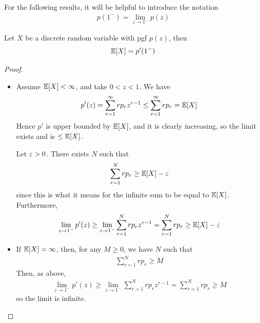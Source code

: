 \documentclass{../../template/note}
\begin{document}
    For the following results, it will be helpful to introduce the notation
    \begin{align*}
        p(1^-) = \lim_{z \to 1^-} p(z)
    \end{align*}

    \begin{proposition}
        Let \(X\) be a discrete random variable with pgf \(p(z)\), then
        \begin{align*}
            \mathbb E[X] = p'(1^-)
        \end{align*}
    \end{proposition}
    
    \begin{proof}
        \begin{itemize}
            \item Assume \(\mathbb E[X] < \infty\), and take \(0 < z < 1\). We have
            \begin{align*}
                p'(z) = \sum_{r=1}^\infty rp_r z^{r-1} \leq \sum_{r=1}^\infty rp_r = \mathbb E[X]
            \end{align*}
            Hence \(p'\) is upper bounded by \(\mathbb E[X]\), and it is clearly increasing, so the limit exists and is \(\leq \mathbb E[X]\).

            Let \(\varepsilon > 0\). There exists \(N\) such that
            \begin{align*}
                \sum_{r=1}^N rp_r \geq \mathbb E[X] - \varepsilon
            \end{align*}
            since this is what it means for the infinite sum to be equal to \(\mathbb E[X]\). Furthermore,
            \begin{align*}
                \lim_{z \to 1^-} p'(z) \geq \lim_{z \to 1^-} \sum_{r=1}^N rp_r z^{r-1} = \sum_{r=1}^N rp_r \geq \mathbb E[X] - \varepsilon
            \end{align*}
            \item If \(\mathbb E[X] = \infty\), then, for any \(M \geq 0\), we have \(N\) such that
            \begin{align*}
                \sum_{r=1}^N rp_r \geq M
            \end{align*}
            Then, as above,
            \begin{align*}
                \lim_{z \to 1^-} p'(z) \geq \lim_{z \to 1^-} \sum_{r=1}^N rp_r z^{r-1} = \sum_{r=1}^N rp_r \geq M
            \end{align*}
            so the limit is infinite.
        \end{itemize}
    \end{proof}
    
\end{document}
